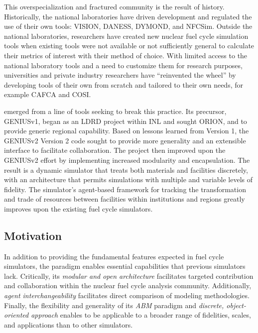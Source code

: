 This overspecialization and fractured community is the result of history. 
Historically, the national laboratories have driven development and regulated 
the use of their own tools: \gls{VISION}\cite{jacobson_verifiable_2010}, 
\gls{DANESS}\cite{van_den_durpel_daness_2009}, 
\gls{DYMOND}\cite{yacout_modeling_2005}, and 
\gls{NFCSim}\cite{schneider_nfcsim:_2005}.  Outside the national laboratories, 
researchers have created new nuclear fuel cycle simulation tools when existing 
tools were not available or not sufficiently general to calculate their metrics 
of interest with their method of choice.  With limited access to the national 
laboratory tools and a need to customize them for research purposes, 
universities and private industry researchers have ``reinvented the wheel'' by 
developing tools of their own from scratch and tailored to their own needs, for 
example \gls{CAFCA}\cite{guerin_impact_2009} and 
\gls{COSI}\cite{boucher_cosi_2005,boucher_cosi:_2006,meyer_new_2009,coquelet-pascal_comparison_2011}. 

\Cyclus emerged from a line of tools seeking to break this practice.  
Its precursor,
\gls{GENIUSv1}\cite{dunzik-gougar_global_2007,jain_transitioning_2006}, began
as an \gls{LDRD} project within \gls{INL} and sought 
\gls{ORION}\cite{}, and 
to provide generic regional capability.  Based on lessons learned from 
Version 1, the 
\acrshort{GENIUSv2} Version 2\cite{oliver_studying_2009,huff_geniusv2_2009} code sought to 
provide more generality and an extensible interface to facilitate 
collaboration.  The \Cyclus project then improved upon the \acrshort{GENIUSv2} 
effort by implementing increased modularity and encapsulation.  The result is  
a dynamic simulator that treats both materials and facilities discretely, with 
an architecture that permits simulations with multiple and variable levels of 
fidelity. The simulator's agent-based framework for tracking the 
transformation and trade of resources between facilities within institutions 
and regions greatly improves upon the existing fuel cycle simulators.

\subsection{Motivation}

In addition to providing the fundamental features expected in fuel cycle 
simulators, the \Cyclus paradigm enables essential capabilities that previous 
simulators lack. Critically, its \emph{modular and open architecture}  facilitates 
targeted contribution and collaboration within the nuclear fuel cycle analysis 
community.  Additionally, \emph{agent interchangeability} facilitates direct 
comparison of modeling methodologies. Finally, the flexibility and generality 
of its \emph{\gls{ABM}} paradigm and \emph{discrete, object-oriented approach} 
enables \Cyclus to be applicable to a broader range of 
fidelities, scales, and applications than to other simulators. 

